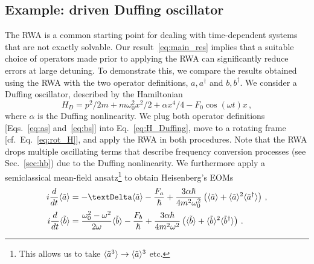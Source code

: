 \subsection{Example: driven Duffing oscillator}
The RWA is a common starting point for dealing with time-dependent systems that are not exactly solvable. Our result~\eqref{eq:main_res} implies that a suitable choice of operators made prior to applying the RWA can significantly reduce errors at large detuning. To demonstrate this, we compare the results obtained using the RWA with the two operator definitions, $a,a^\dagger$ and $b,b^\dagger$. We consider a Duffing oscillator, described by the Hamiltonian
\begin{equation} \label{eq:H_Duffing}
H_D = p^2/2m + m \omega_0^2 x^2/2 + \alpha x^4/4 - F_0 \cos(\omega t)  x\,,
\end{equation}
where $\alpha$ is the Duffing nonlinearity. We plug both operator definitions [Eqs.~\eqref{eq:as} and~\eqref{eq:bs}] into Eq.~\eqref{eq:H_Duffing}, move to a rotating frame [cf.~Eq.~\eqref{eq:rot_H}], and apply the RWA in both procedures. Note that the RWA drops multiple oscillating terms that describe frequency conversion processes (see Sec.~\ref{sec:hb}) due to the Duffing nonlinearity. We furthermore apply a semiclassical mean-field ansatz\footnote{This allows us to take $\langle \tilde{a}^3 \rangle \rightarrow \langle\tilde{a}\rangle^3$ etc.} to obtain Heisenberg's EOMs
\begin{align} \label{eq:duff_a}
% 
i \frac{d}{dt} \etil{a} &=
-\Delta \etil{a}-\frac{F_a}{\hbar}+\frac{3 \alpha \hbar}{4m^2\omega_0^2}\left(\etil{a}+\etil{a}^2\ave{\tilde{a}^\dagger}\right)\,,\\
\label{eq:duff_b}
i \frac{d}{dt} \etil{b} &= 
\frac{\omega_0^2 - \omega^2}{2\omega}\etil{b}-\frac{F_b}{\hbar}+\frac{3\alpha \hbar}{4m^2\omega^2}\left(\etil{b}+\etil{b}^2\ave{\tilde{b}^\dagger}\right)\,.
\end{align}

